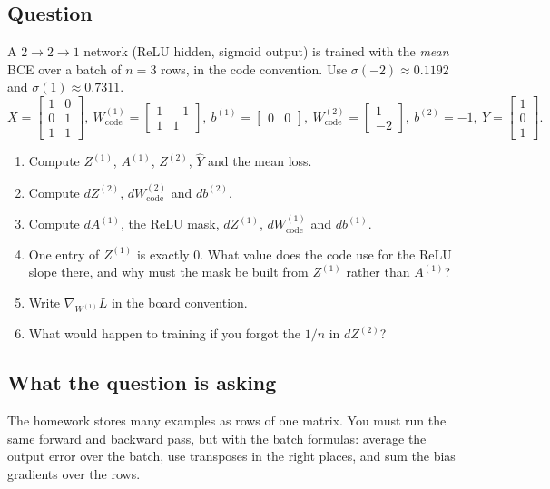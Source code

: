 \documentclass[12pt,a4paper]{article}
\begin{document}
\subsection*{Question}
A $2\to2\to1$ network (ReLU hidden, sigmoid output) is trained with the \emph{mean} BCE over a batch of $n=3$ rows, in the code convention. Use $\sigma(-2)\approx0.1192$ and $\sigma(1)\approx0.7311$.
\[
X=\begin{bmatrix}1&0\\0&1\\1&1\end{bmatrix},\
W^{(1)}_{\text{code}}=\begin{bmatrix}1&-1\\1&1\end{bmatrix},\ b^{(1)}=\begin{bmatrix}0&0\end{bmatrix},\
W^{(2)}_{\text{code}}=\begin{bmatrix}1\\-2\end{bmatrix},\ b^{(2)}=-1,\
Y=\begin{bmatrix}1\\0\\1\end{bmatrix}.
\]
\begin{enumerate}[label=(\alph*)]
\item Compute $Z^{(1)}$, $A^{(1)}$, $Z^{(2)}$, $\hat Y$ and the mean loss.
\item Compute $dZ^{(2)}$, $dW^{(2)}_{\text{code}}$ and $db^{(2)}$.
\item Compute $dA^{(1)}$, the ReLU mask, $dZ^{(1)}$, $dW^{(1)}_{\text{code}}$ and $db^{(1)}$.
\item One entry of $Z^{(1)}$ is exactly 0. What value does the code use for the ReLU slope there, and why must the mask be built from $Z^{(1)}$ rather than $A^{(1)}$?
\item Write $\nabla_{W^{(1)}}L$ in the board convention.
\item What would happen to training if you forgot the $1/n$ in $dZ^{(2)}$?
\end{enumerate}

\subsection*{What the question is asking}
The homework stores many examples as rows of one matrix. You must run the same forward and backward pass, but with the batch formulas: average the output error over the batch, use transposes in the right places, and sum the bias gradients over the rows.
\end{document}
